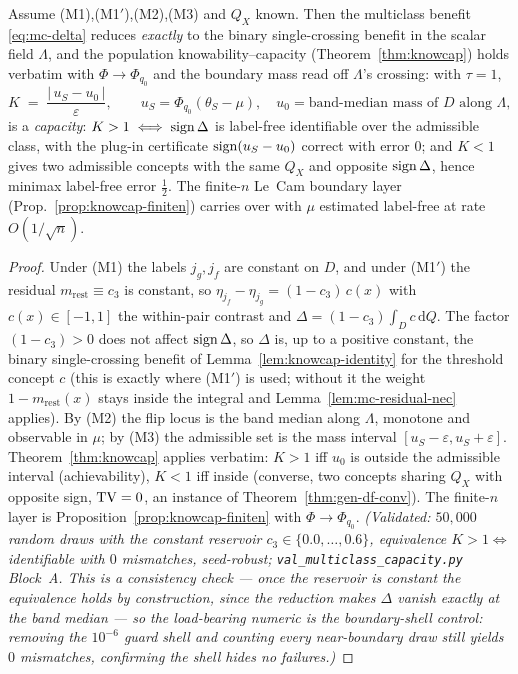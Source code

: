 \begin{theorem}
\label{thm:mc-singlepair}
Assume \textnormal{(M1),(M1$'$),(M2),(M3)} and $Q_X$ known. Then the multiclass benefit
\eqref{eq:mc-delta} reduces \emph{exactly} to the binary single-crossing benefit in the
scalar field $\Lambda$, and the population knowability--capacity
(Theorem~\ref{thm:knowcap}) holds verbatim with $\Phi\to\Phi_{q_0}$ and the boundary mass
read off $\Lambda$'s crossing: with $\tau=1$,
\[
  K \;=\; \frac{\big|\,u_S-u_0\,\big|}{\varepsilon},\qquad
  u_S=\Phi_{q_0}(\theta_S-\mu),\quad
  u_0=\text{band-median mass of }D\text{ along }\Lambda,
\]
is a \emph{capacity}: $K>1\iff\operatorname{sign}\Delta$ is label-free identifiable over the admissible
class, with the plug-in certificate $\operatorname{sign}(u_S-u_0)$ correct with error $0$; and $K<1$
gives two admissible concepts with the same $Q_X$ and opposite $\operatorname{sign}\Delta$, hence
minimax label-free error $\tfrac12$. The finite-$n$ Le~Cam boundary layer
(Prop.~\ref{prop:knowcap-finiten}) carries over with $\mu$ estimated label-free at rate
$O(1/\sqrt n)$.
\end{theorem}
\begin{proof}
Under (M1) the labels $j_g,j_f$ are constant on $D$, and under (M1$'$) the residual
$m_{\mathrm{rest}}\equiv c_3$ is constant, so
$\eta_{j_f}-\eta_{j_g}=(1-c_3)\,c(x)$ with $c(x)\in[-1,1]$ the within-pair contrast and
$\Delta=(1-c_3)\int_D c\,\mathrm dQ$. The factor $(1-c_3)>0$ does not affect $\operatorname{sign}\Delta$,
so $\Delta$ is, up to a positive constant, the binary single-crossing benefit of
Lemma~\ref{lem:knowcap-identity} for the threshold concept $c$ (this is exactly where
(M1$'$) is used; without it the weight $1-m_{\mathrm{rest}}(x)$ stays inside the integral
and Lemma~\ref{lem:mc-residual-nec} applies). By (M2) the flip locus is the band median
along $\Lambda$, monotone and observable in $\mu$; by (M3) the admissible set is the mass
interval $[u_S-\varepsilon,u_S+\varepsilon]$. Theorem~\ref{thm:knowcap} applies verbatim:
$K>1$ iff $u_0$ is outside the admissible interval (achievability), $K<1$ iff inside
(converse, two concepts sharing $Q_X$ with opposite sign, $\mathrm{TV}=0$, an instance of
Theorem~\ref{thm:gen-df-conv}). The finite-$n$ layer is
Proposition~\ref{prop:knowcap-finiten} with $\Phi\to\Phi_{q_0}$.
\emph{(Validated: $50{,}000$ random draws with the constant reservoir
$c_3\in\{0.0,\dots,0.6\}$, equivalence $K>1\iff$ identifiable with $0$ mismatches, seed-robust;
\texttt{val\_multiclass\_capacity.py} Block~A. This is a \emph{consistency} check --- once the
reservoir is constant the equivalence holds by construction, since the reduction makes $\Delta$
vanish exactly at the band median --- so the load-bearing numeric is the boundary-shell control:
removing the $10^{-6}$ guard shell and counting every near-boundary draw still yields $0$
mismatches, confirming the shell hides no failures.)}
\end{proof}

